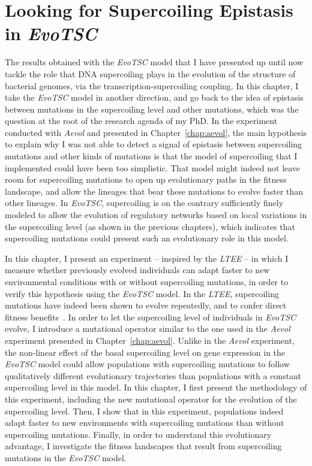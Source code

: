 \chapter{Looking for Supercoiling Epistasis in \emph{EvoTSC}}
\label{chap:epistasis}

The results obtained with the \emph{EvoTSC} model that I have presented up until now tackle the role that DNA supercoiling plays in the evolution of the structure of bacterial genomes, via the transcription-supercoiling coupling.
In this chapter, I take the \emph{EvoTSC} model in another direction, and go back to the idea of epistasis between mutations in the supercoiling level and other mutations, which was the question at the root of the research agenda of my PhD.
In the experiment conducted with \emph{Aevol} and presented in Chapter~\ref{chap:aevol}, the main hypothesis to explain why I was not able to detect a signal of epistasis between supercoiling mutations and other kinds of mutations is that the model of supercoiling that I implemented could have been too simplistic.
That model might indeed not leave room for supercoiling mutations to open up evolutionary paths in the fitness landscape, and allow the lineages that bear these mutations to evolve faster than other lineages.
In \emph{EvoTSC}, supercoiling is on the contrary sufficiently finely modeled to allow the evolution of regulatory networks based on local variations in the supercoiling level (as shown in the previous chapters), which indicates that supercoiling mutations could present such an evolutionary role in this model.

In this chapter, I present an experiment -- inspired by the \emph{LTEE} -- in which I measure whether previously evolved individuals can adapt faster to new environmental conditions with or without supercoiling mutations, in order to verify this hypothesis using the \emph{EvoTSC} model.
In the \emph{LTEE}, supercoiling mutations have indeed been shown to evolve repeatedly, and to confer direct fitness benefits~\citep{crozat2005,crozat2010}.
In order to let the supercoiling level of individuals in \emph{EvoTSC} evolve, I introduce a mutational operator similar to the one used in the \emph{Aevol} experiment presented in Chapter~\ref{chap:aevol}.
Unlike in the \emph{Aevol} experiment, the non-linear effect of the basal supercoiling level on gene expression in the \emph{EvoTSC} model could allow populations with supercoiling mutations to follow qualitatively different evolutionary trajectories than populations with a constant supercoiling level in this model.
In this chapter, I first present the methodology of this experiment, including the new mutational operator for the evolution of the supercoiling level.
Then, I show that in this experiment, populations indeed adapt faster to new environments with supercoiling mutations than without supercoiling mutations.
Finally, in order to understand this evolutionary advantage, I investigate the fitness landscapes that result from supercoiling mutations in the \emph{EvoTSC} model.


